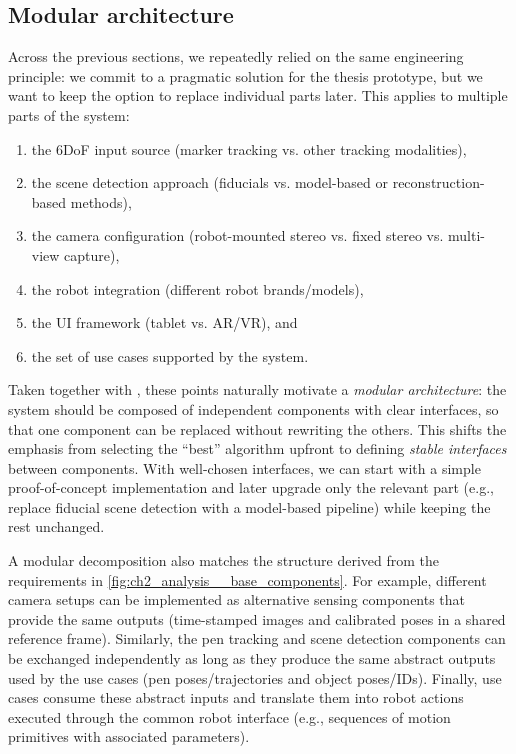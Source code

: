 \subsection{Modular architecture} \label{subsec:ch2_analysis_modular_architecture}

Across the previous sections, we repeatedly relied on the same engineering principle: we commit to a pragmatic solution for the thesis prototype, but we want to keep the option to replace individual parts later. This applies to multiple parts of the system:
\begin{enumerate}[label=(\roman*), itemsep=0.2em]
    \item the 6DoF input source (marker tracking vs. other tracking modalities),
    \item the scene detection approach (fiducials vs. model-based or reconstruction-based methods),
    \item the camera configuration (robot-mounted stereo vs. fixed stereo vs. multi-view capture),
    \item the robot integration (different robot brands/models),
    \item the UI framework (tablet vs. AR/VR), and
    \item the set of use cases supported by the system.
\end{enumerate}

Taken together with , these points naturally motivate a \emph{modular architecture}: the system should be composed of independent components with clear interfaces, so that one component can be replaced without rewriting the others. This shifts the emphasis from selecting the “best” algorithm upfront to defining \emph{stable interfaces} between components. With well-chosen interfaces, we can start with a simple proof-of-concept implementation and later upgrade only the relevant part (e.g., replace fiducial scene detection with a model-based pipeline) while keeping the rest unchanged.

A modular decomposition also matches the structure derived from the requirements in \autoref{fig:ch2_analysis__base_components}. For example, different camera setups can be implemented as alternative sensing components that provide the same outputs (time-stamped images and calibrated poses in a shared reference frame). Similarly, the pen tracking and scene detection components can be exchanged independently as long as they produce the same abstract outputs used by the use cases (pen poses/trajectories and object poses/IDs). Finally, use cases consume these abstract inputs and translate them into robot actions executed through the common robot interface (e.g., sequences of motion primitives with associated parameters).

